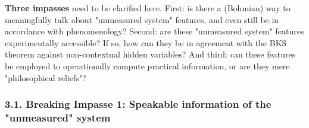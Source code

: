 \documentclass[11pt, a4paper]{article} %
\begin{document}
{\bf Three impasses} need to be clarified here. First: is there a (Bohmian) way to meaningfully talk about "unmeasured system" features, and even still be in accordance with phenomenology? Second: are these "unmeasured system" features experimentally accessible? If so, how can they be in agreement with the BKS theorem against non-contextual hidden variables? And third: can these features be employed to operationally compute practical information, or are they mere "philosophical reliefs"?

\subsubsection*{3.1. Breaking Impasse 1: Speakable information of the "unmeasured" system}\vspace{-0.1cm}
\end{document}
